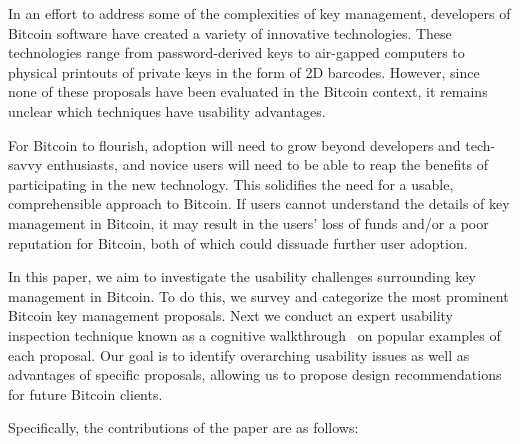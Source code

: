 In an effort to address some of the complexities of key management, developers of Bitcoin software have created a variety of innovative technologies. These technologies range  from password-derived keys to air-gapped computers to physical printouts of private keys in the form of 2D barcodes. However, since none of these proposals have been evaluated in the Bitcoin context, it remains unclear which techniques have usability advantages.

For Bitcoin to flourish, adoption will need to grow beyond developers and tech-savvy enthusiasts, and novice users will need to be able to reap the benefits of participating in the new technology. This solidifies the need for a usable, comprehensible approach to Bitcoin. If users cannot understand the details of key management in Bitcoin, it may result in the users' loss of funds and/or a poor reputation for Bitcoin, both of which could dissuade further user adoption. 

In this paper, we aim to investigate the usability challenges surrounding key management in Bitcoin. To do this, we survey and categorize the most prominent Bitcoin key management proposals. Next we conduct an expert usability inspection technique known as a cognitive walkthrough~\cite{WRLP94} on popular examples of each proposal. Our goal is to identify overarching usability issues as well as advantages of specific proposals, allowing us to propose design recommendations for future Bitcoin clients.



Specifically, the contributions of the paper are as follows:

